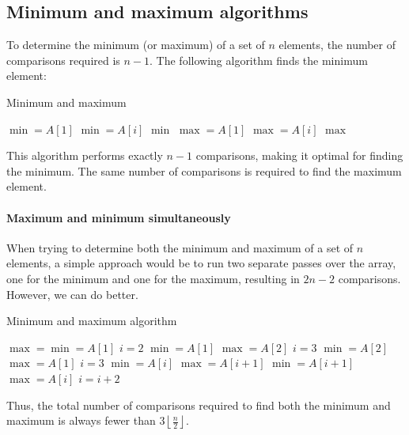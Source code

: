 \subsection{Minimum and maximum algorithms}
To determine the minimum (or maximum) of a set of $n$ elements, the number of comparisons required is $n-1$. 
The following algorithm finds the minimum element:
\begin{algorithm}[H]
    \caption{Minimum and maximum}
    \begin{algorithmic}[1]
        \State $\min=A[1]$ 
                \State $\min=A[i]$
            \EndIf
        \EndFor
        \State \Return $\min$
        \EndFunction
        \Statex 
        \State $\max=A[1]$ 
                \State $\max=A[i]$
            \EndIf
        \EndFor
        \State \Return $\max$
        \EndFunction
    \end{algorithmic}
\end{algorithm}  
This algorithm performs exactly $n-1$ comparisons, making it optimal for finding the minimum.
The same number of comparisons is required to find the maximum element. 

\paragraph*{Maximum and minimum simultaneously}
When trying to determine both the minimum and maximum of a set of $n$ elements, a simple approach would be to run two separate passes over the array, one for the minimum and one for the maximum, resulting in $2n-2$ comparisons. However, we can do better.
\begin{algorithm}[H]
    \caption{Minimum and maximum algorithm}
    \begin{algorithmic}[1]
                \State $\max=\min=A[1]$ 
                \State $i=2$ 
                \State $\min=A[1]$ 
                \State $\max=A[2]$
                \State $i=3$
            \Else 
                \State $\min=A[2]$ 
                \State $\max=A[1]$
                \State $i=3$
            \EndIf
                        \State $\min=A[i]$
                    \EndIf 
                        \State $\max=A[i+1]$ 
                    \EndIf
                \Else 
                        \State $\min=A[i+1]$
                    \EndIf 
                        \State $\max=A[i]$ 
                    \EndIf
                \EndIf
                \State $i=i+2$
            \EndWhile
    \end{algorithmic}
\end{algorithm}  
Thus, the total number of comparisons required to find both the minimum and maximum is always fewer than $3\left\lfloor \frac{n}{2} \right\rfloor$. 

